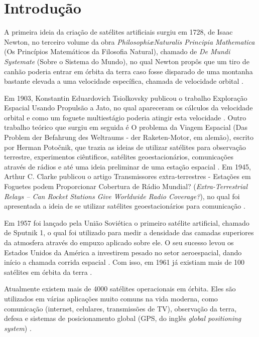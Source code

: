 \chapter{Introdução}

A primeira ideia da criação de satélites artificiais surgiu em 1728, de Isaac Newton, no terceiro volume da obra \textit{Philosophi\ae Naturalis Principia Mathematica} (Os Princípios Matemáticos da Filosofia Natural), chamado de \textit{De Mundi Systemate} (Sobre o Sistema do Mundo), no qual Newton propôs que um tiro de canhão poderia entrar em órbita da terra caso fosse disparado de uma montanha bastante elevada a uma velocidade específica, chamada de velocidade orbital \cite{newton1728}.

Em 1903, Konstantin Eduardovich Tsiolkovsky publicou o trabalho Exploração Espacial Usando Propulsão a Jato, no qual apareceram os cálculos da velocidade orbital e como um foguete multiestágio poderia atingir esta velocidade \cite{maul2012}. Outro trabalho teórico que surgiu em seguida é O problema da Viagem Espacial (Das Problem der Befahrung des Weltraums - der Raketen-Motor, em alemão), escrito por Herman Poto\v{c}nik, que trazia as ideias de utilizar satélites para observação terrestre, experimentos ciêntificos, satélites geoestacionários, comunicações através de rádios e até uma ideia preliminar de uma estação espacial \cite{potocnik1929}. Em 1945, Arthur C. Clarke publicou o artigo Transmissores extra-terrestres - Estações em Foguetes podem Proporcionar Cobertura de Rádio Mundial? (\textit{Extra-Terrestrial Relays – Can Rocket Stations Give Worldwide Radio Coverage?}), no qual foi apresentada a ideia de se utilizar satélites geoestacionários para comunicação \cite{Clarke1945}.

Em 1957 foi lançado pela União Soviética o primeiro satélite artificial, chamado de Sputnik 1, o qual foi utilizado para medir a densidade das camadas superiores da atmosfera através do empuxo aplicado sobre ele. O seu sucesso levou os Estados Unidos da América a investirem pesado no setor aeroespacial, dando início a chamada corrida espacial \cite{McQuaid2017}. Com isso, em 1961 já existiam mais de 100 satélites em órbita da terra \cite{Portree1999}.

Atualmente existem mais de 4000 satélites operacionais em órbita. Eles são utilizados em várias aplicações muito comuns na vida moderna, como comunicação (internet, celulares, transmissões de TV), observação da terra, defesa e sistemas de posicionamento global (GPS, do inglês \textit{global positioning system}) \cite{spaceObjectsIndex2017}.

